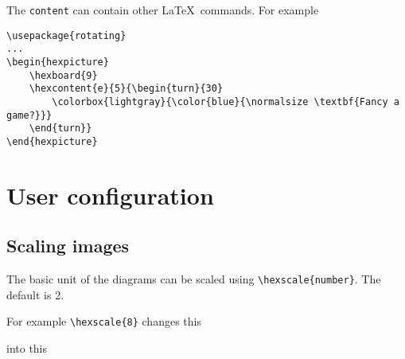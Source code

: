 \documentclass[a4paper,12pt]{article}
\begin{document}
    \begin{hexpicture}
    \end{hexpicture}

    The \verb|content| can contain other \LaTeX\ commands. For example
    
    \begin{verbatim}\usepackage{rotating}
...
\begin{hexpicture}
    \hexboard{9}
    \hexcontent{e}{5}{\begin{turn}{30}
        \colorbox{lightgray}{\color{blue}{\normalsize \textbf{Fancy a game?}}}
    \end{turn}}
\end{hexpicture}\end{verbatim}
    
    
    \begin{hexpicture}
    \end{hexpicture}
    
    \section{User configuration}
    
    \subsection{Scaling images}\label{scaling}
    
    The basic unit of the diagrams can be scaled using \verb|\hexscale{number}|. The default is 2. 
    
    For example \verb|\hexscale{8}| changes this\\
    
    \begin{hexpicture}
    \end{hexpicture}

    into this\\
    
\end{document}
